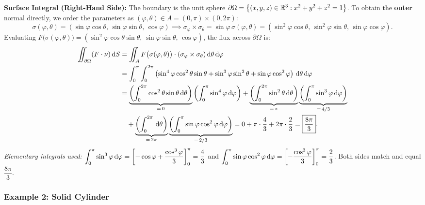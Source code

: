 \begin{exemple}
\textbf{Surface Integral (Right-Hand Side):} The boundary is the unit sphere $\partial\Omega = \left\{(x,y,z) \in \mathbb{R}^3 : x^2 + y^2 + z^2 = 1\right\}$. To obtain the \textbf{outer} normal directly, we order the parameters as $(\varphi, \theta) \in A = (0, \pi) \times (0, 2\pi)$:
\[
    \sigma(\varphi, \theta) = (\sin\varphi \cos\theta, \, \sin\varphi \sin\theta, \, \cos\varphi) \implies \sigma_\varphi \times \sigma_\theta = \sin\varphi \, \sigma(\varphi, \theta) = (\sin^2\varphi \cos\theta, \, \sin^2\varphi \sin\theta, \, \sin\varphi \cos\varphi).
\]
Evaluating $F\big(\sigma(\varphi, \theta)\big) = (\sin^2\varphi \cos\theta \sin\theta, \, \sin\varphi \sin\theta, \, \cos\varphi)$, the flux across $\partial\Omega$ is:
\begin{align*}
    \iint_{\partial\Omega} (F \cdot \nu) \,\mathrm{d}S &= \iint_{A} F\big(\sigma(\varphi, \theta)\big) \cdot (\sigma_\varphi \times \sigma_\theta) \,\mathrm{d}\theta \,\mathrm{d}\varphi \\
    &= \int_{0}^{\pi} \int_{0}^{2\pi} \left( \sin^4\varphi \cos^2\theta \sin\theta + \sin^3\varphi \sin^2\theta + \sin\varphi \cos^2\varphi \right) \,\mathrm{d}\theta \,\mathrm{d}\varphi \\
    &= \underbrace{\left( \int_{0}^{2\pi} \cos^2\theta \sin\theta \,\mathrm{d}\theta \right)}_{=\,0} \left( \int_{0}^{\pi} \sin^4\varphi \,\mathrm{d}\varphi \right) + \underbrace{\left( \int_{0}^{2\pi} \sin^2\theta \,\mathrm{d}\theta \right)}_{=\,\pi} \underbrace{\left( \int_{0}^{\pi} \sin^3\varphi \,\mathrm{d}\varphi \right)}_{=\,4/3} \\
    &\quad + \underbrace{\left( \int_{0}^{2\pi} \,\mathrm{d}\theta \right)}_{=\,2\pi} \underbrace{\left( \int_{0}^{\pi} \sin\varphi \cos^2\varphi \,\mathrm{d}\varphi \right)}_{=\,2/3} = 0 + \pi \cdot \frac{4}{3} + 2\pi \cdot \frac{2}{3} = \boxed{\frac{8\pi}{3}}.
\end{align*}
\emph{Elementary integrals used:} $\displaystyle\int_{0}^{\pi} \sin^3\varphi \,\mathrm{d}\varphi = \left[ -\cos\varphi + \frac{\cos^3\varphi}{3} \right]_{0}^{\pi} = \frac{4}{3}$ and $\displaystyle\int_{0}^{\pi} \sin\varphi \cos^2\varphi \,\mathrm{d}\varphi = \left[ -\frac{\cos^3\varphi}{3} \right]_{0}^{\pi} = \frac{2}{3}$. Both sides match and equal $\dfrac{8\pi}{3}$.
\end{exemple}

\subsubsection{Example 2: Solid Cylinder}

